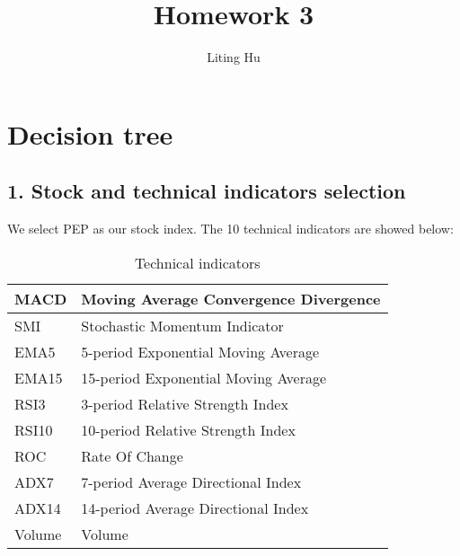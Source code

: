 \documentclass{article}
\begin{document}
  
\title{Homework 3}
\author{Liting Hu}

\maketitle

\section*{Decision tree}
\subsection*{1. Stock and technical indicators selection}
We select PEP as our stock index. The 10 technical indicators are showed below:
\begin{table}[H]
\centering
\begin{tabular}{|l|l|}
\hline
MACD & Moving Average Convergence Divergence \\
\hline
SMI & Stochastic Momentum Indicator\\
\hline
EMA5 & 5-period Exponential Moving Average\\
\hline 
EMA15 & 15-period Exponential Moving Average\\
\hline
RSI3 & 3-period Relative Strength Index\\
\hline
RSI10 & 10-period Relative Strength Index\\
\hline
ROC & Rate Of Change\\
\hline
ADX7 & 7-period Average Directional Index\\
\hline
ADX14 & 14-period Average Directional Index\\
\hline
Volume & Volume\\
\hline
\end{tabular}
\caption{Technical indicators}
\end{table}
\end{document}
